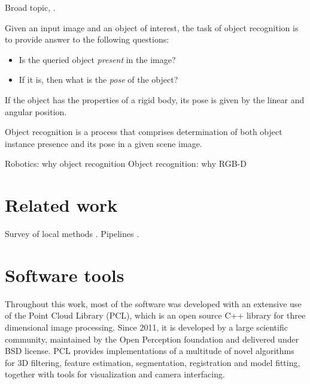 Broad topic, \cite{szeliski}.

Given an input image and an object of interest, the task of object recognition is to provide answer to the following questions:
\begin{itemize}
\item Is the queried object \textit{present} in the image?
\item If it is, then what is the \textit{pose} of the object?
\end{itemize}
If the object has the properties of a rigid body, its pose is given by the linear and angular position.


Object recognition is a process that comprises determination of both object instance presence and its pose in a given scene image.   

Robotics: why object recognition
Object recognition: why RGB-D




\section{Related work}
\label{sec:related}


Survey of local methods \cite{surveyLocal}.
Pipelines \cite{recognitionTutorial,multiPipeline}.


\section{Software tools}
\label{sec:software}

Throughout this work, most of the software was developed with an extensive use of the Point Cloud Library (PCL)\cite{Rusu_ICRA2011_PCL}, which is an open source C++ library for three dimensional image processing. Since 2011, it is developed by a large scientific community, maintained by the Open Perception foundation and delivered under BSD license. PCL provides implementations of a multitude of novel algorithms for 3D filtering, feature estimation, segmentation, registration and model fitting, together with tools for visualization and camera interfacing.

